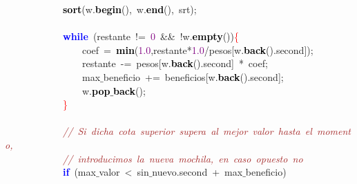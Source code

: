 \mbox{}\ \ \ \ \ \ \ \ \ \ \ \ \textbf{\textcolor{Black}{sort}}\textcolor{BrickRed}{(}w\textcolor{BrickRed}{.}\textbf{\textcolor{Black}{begin}}\textcolor{BrickRed}{(),}\ w\textcolor{BrickRed}{.}\textbf{\textcolor{Black}{end}}\textcolor{BrickRed}{(),}\ srt\textcolor{BrickRed}{);} \\
\mbox{}\ \ \ \ \ \ \ \ \ \ \ \ \ \ \ \  \\
\mbox{}\ \ \ \ \ \ \ \ \ \ \ \ \textbf{\textcolor{Blue}{while}}\ \textcolor{BrickRed}{(}restante\ \textcolor{BrickRed}{!=}\ \textcolor{Purple}{0}\ \textcolor{BrickRed}{\&\&}\ \textcolor{BrickRed}{!}w\textcolor{BrickRed}{.}\textbf{\textcolor{Black}{empty}}\textcolor{BrickRed}{())}\textcolor{Red}{\{} \\
\mbox{}\ \ \ \ \ \ \ \ \ \ \ \ \ \ \ \ coef\ \textcolor{BrickRed}{=}\ \textbf{\textcolor{Black}{min}}\textcolor{BrickRed}{(}\textcolor{Purple}{1.0}\textcolor{BrickRed}{,}restante\textcolor{BrickRed}{*}\textcolor{Purple}{1.0}\textcolor{BrickRed}{/}pesos\textcolor{BrickRed}{[}w\textcolor{BrickRed}{.}\textbf{\textcolor{Black}{back}}\textcolor{BrickRed}{().}second\textcolor{BrickRed}{]);} \\
\mbox{}\ \ \ \ \ \ \ \ \ \ \ \ \ \ \ \ restante\ \textcolor{BrickRed}{-=}\ pesos\textcolor{BrickRed}{[}w\textcolor{BrickRed}{.}\textbf{\textcolor{Black}{back}}\textcolor{BrickRed}{().}second\textcolor{BrickRed}{]}\ \textcolor{BrickRed}{*}\ coef\textcolor{BrickRed}{;} \\
\mbox{}\ \ \ \ \ \ \ \ \ \ \ \ \ \ \ \ max$\_$beneficio\ \textcolor{BrickRed}{+=}\ beneficios\textcolor{BrickRed}{[}w\textcolor{BrickRed}{.}\textbf{\textcolor{Black}{back}}\textcolor{BrickRed}{().}second\textcolor{BrickRed}{];} \\
\mbox{}\ \ \ \ \ \ \ \ \ \ \ \ \ \ \ \ w\textcolor{BrickRed}{.}\textbf{\textcolor{Black}{pop$\_$back}}\textcolor{BrickRed}{();} \\
\mbox{}\ \ \ \ \ \ \ \ \ \ \ \ \textcolor{Red}{\}} \\
\mbox{}\ \ \ \ \ \ \ \ \ \ \ \ \ \ \ \  \\
\mbox{}\ \ \ \ \ \ \ \ \ \ \ \ \textit{\textcolor{Brown}{//\ Si\ dicha\ cota\ superior\ supera\ al\ mejor\ valor\ hasta\ el\ momento,}} \\
\mbox{}\ \ \ \ \ \ \ \ \ \ \ \ \textit{\textcolor{Brown}{//\ introducimos\ la\ nueva\ mochila,\ en\ caso\ opuesto\ no}} \\
\mbox{}\ \ \ \ \ \ \ \ \ \ \ \ \textbf{\textcolor{Blue}{if}}\ \textcolor{BrickRed}{(}max$\_$valor\ \textcolor{BrickRed}{\textless{}}\ sin$\_$nuevo\textcolor{BrickRed}{.}second\ \textcolor{BrickRed}{+}\ max$\_$beneficio\textcolor{BrickRed}{)} \\
